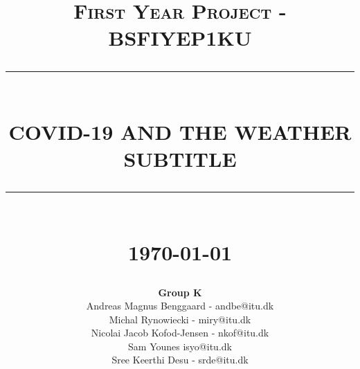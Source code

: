 \documentclass[11pt]{article}
\newcommand{\HRule}[1]{\rule{\linewidth}{#1}}
\begin{document}
% 
\title{ \normalsize \textsc{First Year Project - BSFIYEP1KU}
		\\ [2.0cm]
		\HRule{0.5pt} \\
		\LARGE \textbf{\uppercase{COVID-19 and the Weather}\\
		\normalsize{\textsc{SUBTITLE}}}
		\HRule{2pt} \\ [0.5cm]
		\normalsize \today \vspace*{5\baselineskip}}

\date{}

\author{
		\textbf{Group K} \\ 
		Andreas Magnus Benggaard - andbe@itu.dk\\ 
		Michal Rynowiecki - miry@itu.dk\\ 
		Nicolai Jacob Kofod-Jensen - nkof@itu.dk\\ 
		Sam Younes isyo@itu.dk \\ 
		Sree Keerthi Desu - srde@itu.dk}

\maketitle
\newpage

\tableofcontents
\newpage

\sectionfont{\scshape}











\newpage
{}

\end{document}
